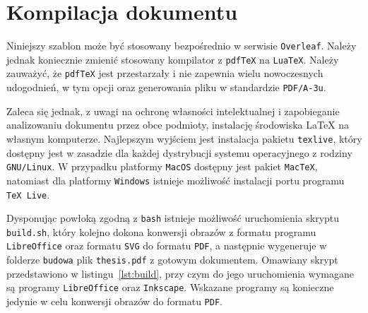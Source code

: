\chapter{Kompilacja dokumentu}

Niniejszy szablon może być stosowany bezpośrednio w serwisie \texttt{Overleaf}. Należy jednak koniecznie zmienić stosowany kompilator z \texttt{pdfTeX} na \texttt{LuaTeX}. Należy zauważyć, że \texttt{pdfTeX} jest przestarzały i nie zapewnia wielu nowoczesnych udogodnień, w tym opcji \texttt{} oraz generowania pliku w standardzie \texttt{PDF/A-3u}.

Zaleca się jednak, z uwagi na ochronę własności intelektualnej i zapobieganie analizowaniu dokumentu przez obce podmioty, instalację środowiska \LaTeX{} na własnym komputerze. Najlepszym wyjściem jest instalacja pakietu \texttt{texlive}, który dostępny jest w zasadzie dla każdej dystrybucji systemu operacyjnego z rodziny \texttt{GNU/Linux}. W przypadku platformy \texttt{MacOS} dostępny jest pakiet \texttt{MacTeX}, natomiast dla platformy \texttt{Windows} istnieje możliwość instalacji portu programu \texttt{TeX Live}.

Dysponując powłoką zgodną z \texttt{bash} istnieje możliwość uruchomienia skryptu \texttt{build.sh}, który kolejno dokona konwersji obrazów z formatu programu \texttt{LibreOffice} oraz formatu \texttt{SVG} do formatu \texttt{PDF}, a następnie wygeneruje w folderze \texttt{budowa} plik \texttt{thesis.pdf} z gotowym dokumentem. Omawiany skrypt przedstawiono w listingu~\ref{lst:build}, przy czym do jego uruchomienia wymagane są programy \texttt{LibreOffice} oraz \texttt{Inkscape}. Wskazane programy są konieczne jedynie w celu konwersji obrazów do formatu \texttt{PDF}.

\begin{listing}[hbt!]
\inputminted[linenos, breaklines]{bash}{build.sh}
\end{listing}
